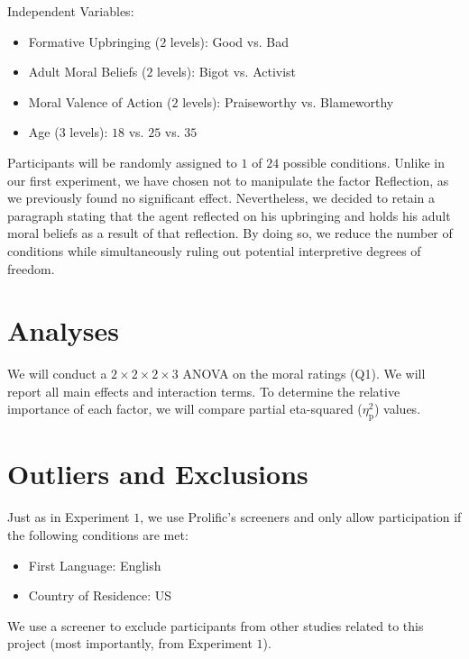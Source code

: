 \documentclass[scrarticle]{scrartcl}
\begin{document}
\vspace{0.75em}
\noindent Independent Variables:

\begin{itemize}[noitemsep]
   \item[(1)] Formative Upbringing ($2$ levels): Good vs. Bad
   \item[(2)] Adult Moral Beliefs ($2$ levels): Bigot vs. Activist
   \item[(3)] Moral Valence of Action ($2$ levels): Praiseworthy vs. Blameworthy
   \item[(4)] Age ($3$ levels): $18$ vs. $25$ vs. $35$
\end{itemize}

\noindent Participants will be randomly assigned to $1$ of $24$ possible conditions.
Unlike in our first experiment, we have chosen not to manipulate the factor Reflection, as we previously found no significant effect.
Nevertheless, we decided to retain a paragraph stating that the agent reflected on his upbringing and holds his adult moral beliefs as a result of that reflection.
By doing so, we reduce the number of conditions while simultaneously ruling out potential interpretive degrees of freedom.


\section{Analyses}
We will conduct a $2 \times 2 \times 2 \times 3$ ANOVA on the moral ratings (Q1).
We will report all main effects and interaction terms.
To determine the relative importance of each factor, we will compare partial eta-squared ($\eta_{\text{p}}^{2}$) values.


\section{Outliers and Exclusions}
Just as in Experiment $1$, we use Prolific's screeners and only allow participation if the following conditions are met:

\begin{itemize}[noitemsep]
   \item[--] First Language: English
   \item[--] Country of Residence: US
\end{itemize}

We use a screener to exclude participants from other studies related to this project (most importantly, from Experiment $1$).
\end{document}
